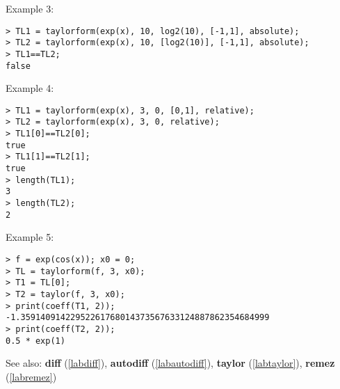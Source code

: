 \noindent Example 3: 
\begin{center}\begin{minipage}{15cm}\begin{Verbatim}[frame=single]
> TL1 = taylorform(exp(x), 10, log2(10), [-1,1], absolute);
> TL2 = taylorform(exp(x), 10, [log2(10)], [-1,1], absolute);
> TL1==TL2;
false
\end{Verbatim}
\end{minipage}\end{center}
\noindent Example 4: 
\begin{center}\begin{minipage}{15cm}\begin{Verbatim}[frame=single]
> TL1 = taylorform(exp(x), 3, 0, [0,1], relative);
> TL2 = taylorform(exp(x), 3, 0, relative);
> TL1[0]==TL2[0];
true
> TL1[1]==TL2[1];
true
> length(TL1);
3
> length(TL2);
2
\end{Verbatim}
\end{minipage}\end{center}
\noindent Example 5: 
\begin{center}\begin{minipage}{15cm}\begin{Verbatim}[frame=single]
> f = exp(cos(x)); x0 = 0;
> TL = taylorform(f, 3, x0);
> T1 = TL[0];
> T2 = taylor(f, 3, x0);
> print(coeff(T1, 2));
-1.35914091422952261768014373567633124887862354684999
> print(coeff(T2, 2));
0.5 * exp(1)
\end{Verbatim}
\end{minipage}\end{center}
See also: \textbf{diff} (\ref{labdiff}), \textbf{autodiff} (\ref{labautodiff}), \textbf{taylor} (\ref{labtaylor}), \textbf{remez} (\ref{labremez})
